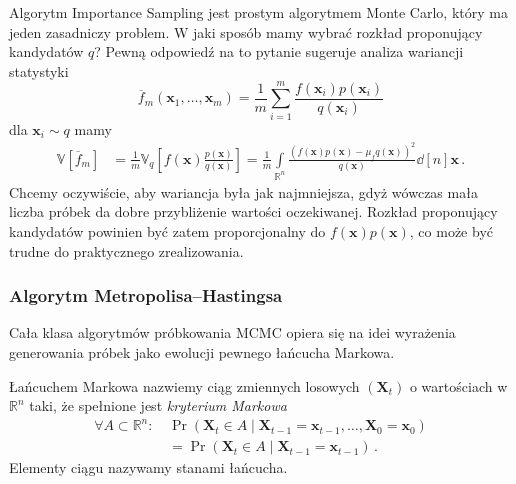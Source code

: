 \documentclass{myclass}
\numberwithin{equation}{subsection}
\begin{document}
Algorytm Importance Sampling jest prostym algorytmem Monte Carlo, który ma jeden zasadniczy problem.
W jaki sposób mamy wybrać rozkład proponujący kandydatów \(q\)? Pewną odpowiedź na to pytanie
sugeruje analiza wariancji statystyki 
\begin{equation}
    \overline{f}_m(\bm{x}_1,\ldots,\bm{x}_m) = \frac{1}{m}\sum_{i=1}^m \frac{f(\bm{x}_i)p(\bm{x}_i)}{q(\bm{x}_i)}
\end{equation}
dla \(\bm{x}_i \sim q\) mamy
\begin{equation}
    \begin{split}
        \mathbb{V}[\overline{f}_m] &= \frac{1}{m}\mathbb{V}_q\left[f(\bm{x})\frac{p(\bm{x})}{q(\bm{x})}\right] = \frac{1}{m}\int\limits_{\mathbb{R}^n}\frac{(f(\bm{x})p(\bm{x}) - \mu_fq(\bm{x}))^2}{q(\bm{x})}\dd[n]{\bm{x}}\,.
    \end{split}
\end{equation}
Chcemy oczywiście, aby wariancja była jak najmniejsza, gdyż wówczas mała liczba próbek da dobre
przybliżenie wartości oczekiwanej. Rozkład proponujący kandydatów powinien być zatem proporcjonalny
do \(f(\bm{x})p(\bm{x})\), co może być trudne do praktycznego zrealizowania.


\subsubsection{Algorytm Metropolisa--Hastingsa}

Cała klasa algorytmów próbkowania MCMC opiera się na idei wyrażenia generowania próbek jako ewolucji
pewnego łańcucha Markowa.

\begin{definition}
Łańcuchem Markowa nazwiemy ciąg zmiennych losowych \((\bm{X}_t)\) o wartościach w \(\mathbb{R}^n\)
taki, że spełnione jest \emph{kryterium Markowa}
\begin{equation*}
    \begin{split}
        \forall A \subset \mathbb{R}^n :\, &\Pr(\bm{X}_t \in A \mid \bm{X}_{t-1} = \bm{x}_{t-1}, \ldots, \bm{X}_0 = \bm{x}_0) \\
        &= \Pr(\bm{X}_t \in A \mid \bm{X}_{t-1} = \bm{x}_{t-1})\,.
    \end{split}
\end{equation*}
Elementy ciągu nazywamy stanami łańcucha.
\end{definition}
\end{document}
